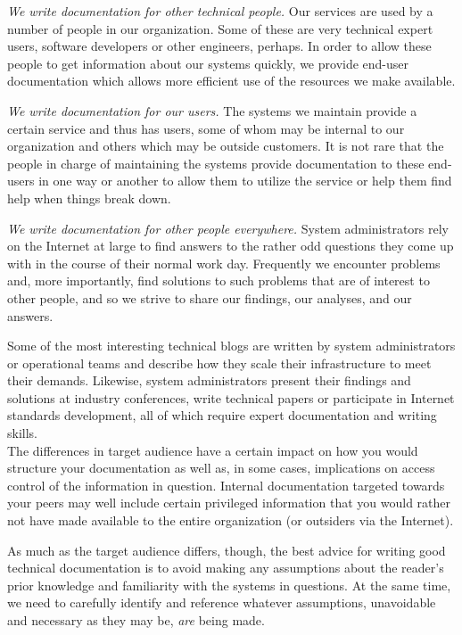 {\em We write documentation for other technical
people.} Our services are used by a number of people
in our organization.  Some of these are very technical
expert users, software developers or other engineers,
perhaps.  In order to allow these people to get
information about our systems quickly, we provide
end-user documentation which allows more efficient use
of the resources we make available.

{\em We write documentation for our users.} The
systems we maintain provide a certain service and thus
has users, some of whom may be internal to our
organization and others which may be outside
customers.  It is not rare that the people in charge
of maintaining the systems provide documentation to
these end-users in one way or another to allow them to
utilize the service or help them find help when things
break down.

{\em We write documentation for other people
everywhere.} System administrators rely on the
Internet at large to find answers to the rather odd
questions they come up with in the course of their
normal work day.  Frequently we encounter problems
and, more importantly, find solutions to such problems
that are of interest to other people, and so we strive
to share our findings, our analyses, and our answers.

Some of the most interesting technical blogs are
written by system administrators or operational teams
and describe how they scale their infrastructure to
meet their demands.  Likewise, system administrators
present their findings and solutions at industry
conferences, write technical papers or participate in
Internet standards development, all of which require
expert documentation and writing skills.  \\

The differences in target audience have a certain
impact on how you would structure your documentation
as well as, in some cases, implications on access
control of the information in question.  Internal
documentation targeted towards your peers may well
include certain privileged information that you would
rather not have made available to the entire
organization (or outsiders via the Internet).

As much as the target audience differs, though, the
best advice for writing good technical documentation
is to avoid making any assumptions about the reader's
prior knowledge and familiarity with the systems in
questions.  At the same time, we need to carefully
identify and reference whatever assumptions,
unavoidable and necessary as they may be, {\em are}
being made.

